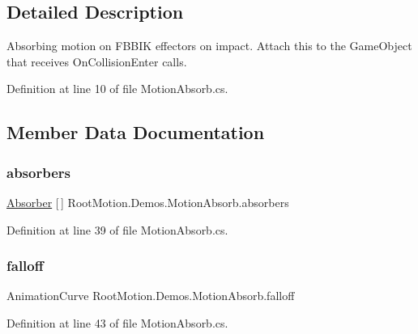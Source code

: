 \subsection{Detailed Description}
Absorbing motion on F\+B\+B\+IK effectors on impact. Attach this to the Game\+Object that receives On\+Collision\+Enter calls. 



Definition at line 10 of file Motion\+Absorb.\+cs.



\subsection{Member Data Documentation}
\mbox{\label{class_root_motion_1_1_demos_1_1_motion_absorb_a8f775453da2cb4e35894a35ebac6db87}} 
\subsubsection{\texorpdfstring{absorbers}{absorbers}}
{\footnotesize\ttfamily \mbox{\hyperlink{class_root_motion_1_1_demos_1_1_motion_absorb_1_1_absorber}{Absorber}} \mbox{[}$\,$\mbox{]} Root\+Motion.\+Demos.\+Motion\+Absorb.\+absorbers}



Definition at line 39 of file Motion\+Absorb.\+cs.

\mbox{\label{class_root_motion_1_1_demos_1_1_motion_absorb_af55f2f82215cf2cd6926e27bde90f20a}} 
\subsubsection{\texorpdfstring{falloff}{falloff}}
{\footnotesize\ttfamily Animation\+Curve Root\+Motion.\+Demos.\+Motion\+Absorb.\+falloff}



Definition at line 43 of file Motion\+Absorb.\+cs.

